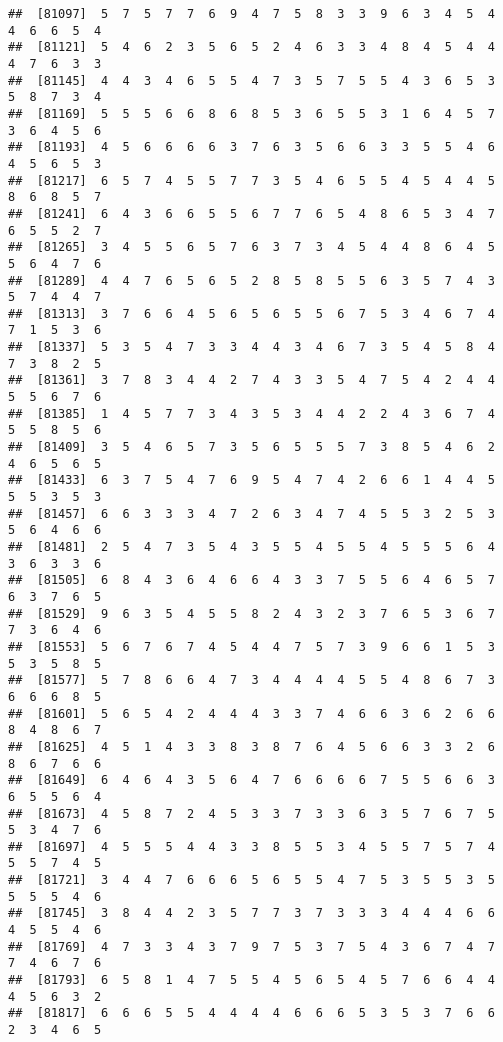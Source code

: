 \documentclass[
]{book}
\begin{document}
\begin{verbatim}
##  [81097]  5  7  5  7  7  6  9  4  7  5  8  3  3  9  6  3  4  5  4  4  6  6  5  4
##  [81121]  5  4  6  2  3  5  6  5  2  4  6  3  3  4  8  4  5  4  4  4  7  6  3  3
##  [81145]  4  4  3  4  6  5  5  4  7  3  5  7  5  5  4  3  6  5  3  5  8  7  3  4
##  [81169]  5  5  5  6  6  8  6  8  5  3  6  5  5  3  1  6  4  5  7  3  6  4  5  6
##  [81193]  4  5  6  6  6  6  3  7  6  3  5  6  6  3  3  5  5  4  6  4  5  6  5  3
##  [81217]  6  5  7  4  5  5  7  7  3  5  4  6  5  5  4  5  4  4  5  8  6  8  5  7
##  [81241]  6  4  3  6  6  5  5  6  7  7  6  5  4  8  6  5  3  4  7  6  5  5  2  7
##  [81265]  3  4  5  5  6  5  7  6  3  7  3  4  5  4  4  8  6  4  5  5  6  4  7  6
##  [81289]  4  4  7  6  5  6  5  2  8  5  8  5  5  6  3  5  7  4  3  5  7  4  4  7
##  [81313]  3  7  6  6  4  5  6  5  6  5  5  6  7  5  3  4  6  7  4  7  1  5  3  6
##  [81337]  5  3  5  4  7  3  3  4  4  3  4  6  7  3  5  4  5  8  4  7  3  8  2  5
##  [81361]  3  7  8  3  4  4  2  7  4  3  3  5  4  7  5  4  2  4  4  5  5  6  7  6
##  [81385]  1  4  5  7  7  3  4  3  5  3  4  4  2  2  4  3  6  7  4  5  5  8  5  6
##  [81409]  3  5  4  6  5  7  3  5  6  5  5  5  7  3  8  5  4  6  2  4  6  5  6  5
##  [81433]  6  3  7  5  4  7  6  9  5  4  7  4  2  6  6  1  4  4  5  5  5  3  5  3
##  [81457]  6  6  3  3  3  4  7  2  6  3  4  7  4  5  5  3  2  5  3  5  6  4  6  6
##  [81481]  2  5  4  7  3  5  4  3  5  5  4  5  5  4  5  5  5  6  4  3  6  3  3  6
##  [81505]  6  8  4  3  6  4  6  6  4  3  3  7  5  5  6  4  6  5  7  6  3  7  6  5
##  [81529]  9  6  3  5  4  5  5  8  2  4  3  2  3  7  6  5  3  6  7  7  3  6  4  6
##  [81553]  5  6  7  6  7  4  5  4  4  7  5  7  3  9  6  6  1  5  3  5  3  5  8  5
##  [81577]  5  7  8  6  6  4  7  3  4  4  4  4  5  5  4  8  6  7  3  6  6  6  8  5
##  [81601]  5  6  5  4  2  4  4  4  3  3  7  4  6  6  3  6  2  6  6  8  4  8  6  7
##  [81625]  4  5  1  4  3  3  8  3  8  7  6  4  5  6  6  3  3  2  6  8  6  7  6  6
##  [81649]  6  4  6  4  3  5  6  4  7  6  6  6  6  7  5  5  6  6  3  6  5  5  6  4
##  [81673]  4  5  8  7  2  4  5  3  3  7  3  3  6  3  5  7  6  7  5  5  3  4  7  6
##  [81697]  4  5  5  5  4  4  3  3  8  5  5  3  4  5  5  7  5  7  4  5  5  7  4  5
##  [81721]  3  4  4  7  6  6  6  5  6  5  5  4  7  5  3  5  5  3  5  5  5  5  4  6
##  [81745]  3  8  4  4  2  3  5  7  7  3  7  3  3  3  4  4  4  6  6  4  5  5  4  6
##  [81769]  4  7  3  3  4  3  7  9  7  5  3  7  5  4  3  6  7  4  7  7  4  6  7  6
##  [81793]  6  5  8  1  4  7  5  5  4  5  6  5  4  5  7  6  6  4  4  4  5  6  3  2
##  [81817]  6  6  6  5  5  4  4  4  4  6  6  6  5  3  5  3  7  6  6  2  3  4  6  5

\end{verbatim}
\end{document}
